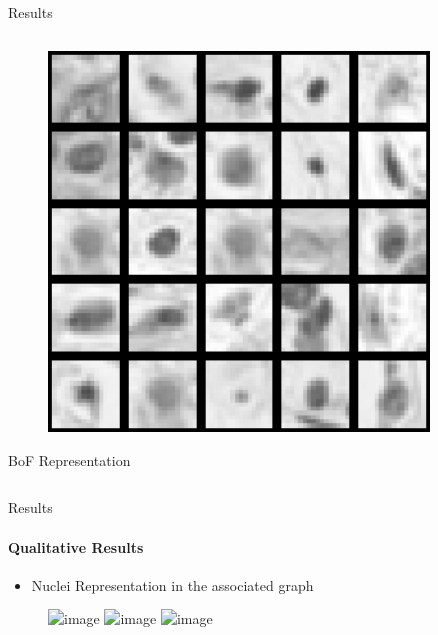 \documentclass[usenames,dvipsnames]{beamer}
\begin{document}
\begin{frame}{Results}
\begin{columns}[t, totalwidth=1\textwidth]
\begin{column}{0.5\textwidth}         %
\begin{center}
\begin{figure}
\includegraphics[width=0.9\textwidth]{imagenes/diccionario_test.png}
\end{figure}
\centering\small BoF Representation
\end{center} 
\end{column}
\end{columns}
\end{frame}


\begin{frame}{Results}
\framesubtitle{Qualitative Results}
\begin{itemize}
\item Nuclei Representation in the associated graph
\end{itemize}
\begin{figure}
\includegraphics<1>[width=0.85\textwidth]{imagenes/grafo1a.png}
\includegraphics<2>[width=0.85\textwidth]{imagenes/grafo2a.png}
\includegraphics<3>[width=0.85\textwidth]{imagenes/grafo3a.png}
\end{figure}

\small\centering
{}
\small\centering
{}
\small\centering
{}
\end{frame}
\end{document}
